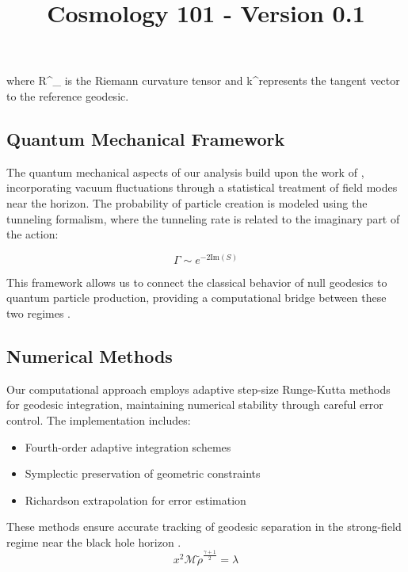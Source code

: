 \documentclass{article}\usepackage{graphicx} \usepackage{amsmath} \usepackage{colortbl}\title{Cosmology 101 - Version 0.1}
\begin{document}
where R^\mu_{\nu\alpha\beta} is the Riemann curvature tensor and k^\mu represents the tangent vector to the reference geodesic.

\subsection{Quantum Mechanical Framework}
The quantum mechanical aspects of our analysis build upon the work of \cite{unruh1981}, incorporating vacuum fluctuations through a statistical treatment of field modes near the horizon. The probability of particle creation is modeled using the tunneling formalism, where the tunneling rate \Gamma is related to the imaginary part of the action:

\begin{equation}
\Gamma \sim e^{-2\text{Im}(S)}
\end{equation}

This framework allows us to connect the classical behavior of null geodesics to quantum particle production, providing a computational bridge between these two regimes \cite{bekenstein1973}.

\subsection{Numerical Methods}
Our computational approach employs adaptive step-size Runge-Kutta methods for geodesic integration, maintaining numerical stability through careful error control. The implementation includes:

\begin{itemize}
\item Fourth-order adaptive integration schemes
\item Symplectic preservation of geometric constraints
\item Richardson extrapolation for error estimation
\end{itemize}

These methods ensure accurate tracking of geodesic separation in the strong-field regime near the black hole horizon \cite{visser1998}. \begin{equation}x^2 \mathcal{M} \tilde{\rho }^{\frac{\gamma +1}{2}}=\lambda \label{Mi ecuacion 8} \end{equation}
\end{document}
